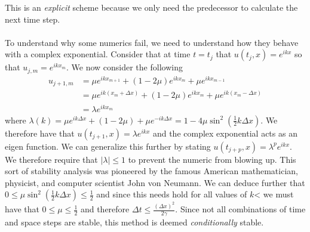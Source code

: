 \documentclass{article}
\numberwithin{equation}{section}
\begin{document}
This is an \emph{explicit} scheme because we only need the predecessor to calculate the next time step. \\\\
To understand why some numerics fail, we need to understand how they behave with a complex exponential. Consider that at time $t=t_j$ that $u(t_j,x)=e^{ikx}$ so that $u_{j,m} = e^{ikx_m}$. We now consider the following 
\begin{equation*}
    \begin{split}
        u_{j+1,m} &= \mu e^{ikx_{m+1}}+(1-2\mu )e^{ikx_m}+\mu e^{ikx_{m-1}} \\ &= \mu e^{ik(x_m+\Delta x)}+(1-2\mu )e^{ikx_m}+\mu e^{ik(x_m -\Delta x)} \\
        &= \lambda e^{ikx_m}
    \end{split}
\end{equation*}
where $\lambda (k) = \mu e^{ik\Delta x}+(1-2\mu)+\mu e^{-ik\Delta x} = 1-4\mu \sin^2(\frac{1}{2}k\Delta x)$. We therefore have that $u(t_{j+1},x)=\lambda e^{ikx}$ and the complex exponential acts as an eigen function. We can generalize this further by stating $u(t_{j+p},x) = \lambda^p e^{ikx}$. We therefore require that $|\lambda|\leq 1$ to prevent the numeric from blowing up. This sort of stability analysis was pioneered by the famous American mathematician, physicist, and computer scientist John von Neumann. We can deduce further that $0\leq \mu \sin^2(\frac{1}{2}k\Delta x) \leq \frac{1}{2}$ and since this needs hold for all values of $k$< we must have that $0\leq \mu \leq \frac{1}{2}$ and therefore $\Delta t \leq \frac{(\Delta x)^2}{2\gamma}$. Since not all combinations of time and space steps are stable, this method is deemed \emph{conditionally} stable. 
\end{document}
